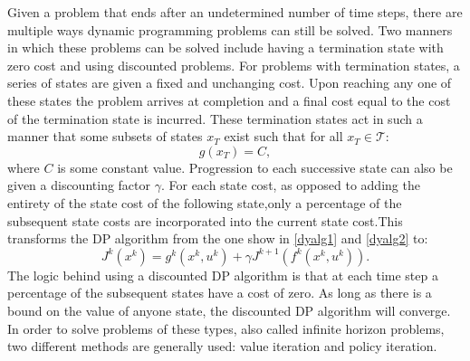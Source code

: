 Given a problem that ends after an undetermined number of time steps, there are multiple ways dynamic programming problems can still be solved. Two manners in which these problems can be solved include having a termination state with zero cost and using discounted problems. For problems with termination states, a series of states are given a fixed and unchanging cost. Upon reaching any one of these states the problem arrives at completion and a final cost equal to the cost of the termination state is incurred. These termination states act in such a manner that some subsets of states $x_T$ exist such that for all $x_T \in \mathscr{T}$:
\begin{equation*}
g(x_T) = C,
\end{equation*}
where $C$ is some constant value.
Progression to each successive state can also be given a discounting factor $\gamma$. For each state cost, as opposed to adding the entirety of the state cost of the following state,only a percentage of the subsequent state costs are incorporated into the current state cost.This transforms the DP algorithm from the one show in \ref{dyalg1} and \ref{dyalg2} to:
\begin{equation}\label{dyalgdis}
J^k(x^k)= g^k(x^k,u^k)+\gamma J^{k+1}(f^k(x^k,u^k)).
\end{equation}        
The logic behind using a discounted DP algorithm is that at each time step a percentage of the subsequent states have a cost of zero. As long as there is a bound on the value of anyone state, the discounted DP algorithm will converge. In order to solve problems of these types, also called infinite horizon problems, two different methods are generally used: value iteration and policy iteration.\cite{bert}  

